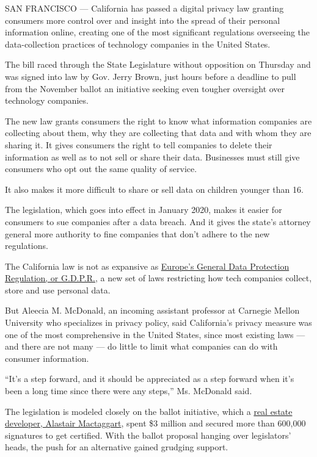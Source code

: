 SAN FRANCISCO --- California has passed a digital privacy law granting
consumers more control over and insight into the spread of their
personal information online, creating one of the most significant
regulations overseeing the data-collection practices of technology
companies in the United States.

The bill raced through the State Legislature without opposition on
Thursday and was signed into law by Gov. Jerry Brown, just hours before
a deadline to pull from the November ballot an initiative seeking even
tougher oversight over technology companies.

The new law grants consumers the right to know what information
companies are collecting about them, why they are collecting that data
and with whom they are sharing it. It gives consumers the right to tell
companies to delete their information as well as to not sell or share
their data. Businesses must still give consumers who opt out the same
quality of service.

It also makes it more difficult to share or sell data on children
younger than 16.

The legislation, which goes into effect in January 2020, makes it easier
for consumers to sue companies after a data breach. And it gives the
state's attorney general more authority to fine companies that don't
adhere to the new regulations.

The California law is not as expansive as
\href{https://www.nytimes.com/2018/05/06/technology/gdpr-european-privacy-law.html?action=click\&module=RelatedCoverage\&pgtype=Article\&region=Footer}{Europe's
General Data Protection Regulation, or G.D.P.R.}, a new set of laws
restricting how tech companies collect, store and use personal data.

But Aleecia M. McDonald, an incoming assistant professor at Carnegie
Mellon University who specializes in privacy policy, said California's
privacy measure was one of the most comprehensive in the United States,
since most existing laws --- and there are not many --- do little to
limit what companies can do with consumer information.

``It's a step forward, and it should be appreciated as a step forward
when it's been a long time since there were any steps,'' Ms. McDonald
said.

The legislation is modeled closely on the ballot initiative, which a
\href{https://www.nytimes.com/2018/05/13/business/california-data-privacy-ballot-measure.html}{real
estate developer, Alastair Mactaggart}, spent \$3 million and secured
more than 600,000 signatures to get certified. With the ballot proposal
hanging over legislators' heads, the push for an alternative gained
grudging support.

